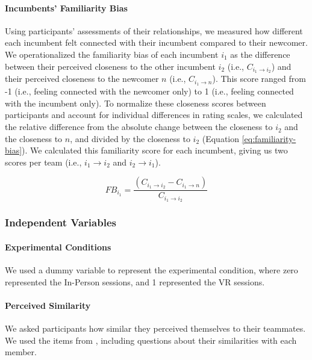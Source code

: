 \paragraph{Incumbents' Familiarity Bias}
Using participants' assessments of their relationships, we measured how different each incumbent felt connected with their incumbent compared to their newcomer. We operationalized the familiarity bias of each incumbent $i_1$ as the difference between their perceived closeness to the other incumbent $i_2$ (i.e., $C_{i_1 \rightarrow i_2}$) and their perceived closeness to the newcomer $n$ (i.e., $C_{i_1 \rightarrow n}$). This score ranged from -1 (i.e., feeling connected with the newcomer only) to 1 (i.e., feeling connected with the incumbent only). To normalize these closeness scores between participants and account for individual differences in rating scales, we calculated the relative difference from the absolute change between the closeness to $i_2$ and the closeness to $n$, and divided by the closeness to $i_2$ (Equation \ref{eq:familiarity-bias}). We calculated this familiarity score for each incumbent, giving us two scores per team (i.e., $i_1 \rightarrow i_2$ and $i_2 \rightarrow i_1$). 

\begin{equation}
FB_{i_1} = \frac{\left(C_{i_{1} \rightarrow i_{2}} - C_{i_{1} \rightarrow n}\right)}{C_{i_{1} \rightarrow i_{2}}}
\label{eq:familiarity-bias}
\end{equation}

\subsubsection{Independent Variables}

\paragraph{Experimental Conditions} We used a dummy variable to represent the experimental condition, where zero represented the In-Person sessions, and 1 represented the VR sessions. 

\paragraph{Perceived Similarity} We asked participants how similar they perceived themselves to their teammates. We used the items from \cite{brucks2022virtual}, including questions about their similarities with each member. 


